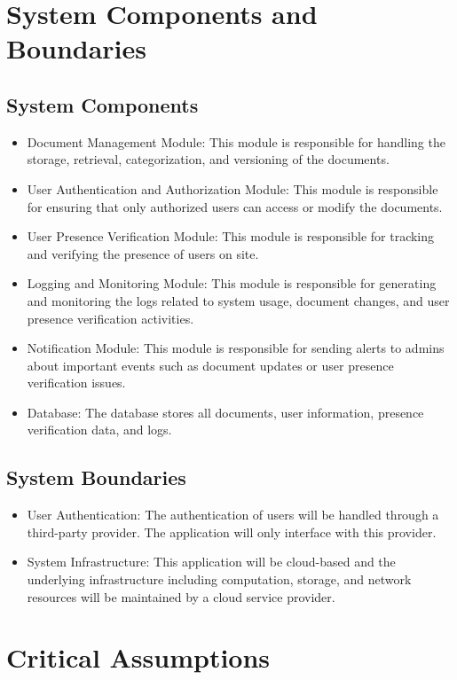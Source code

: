 \documentclass{article}
\begin{document}
\section{System Components and Boundaries}

\subsection{System Components}
\begin{itemize}
  \item Document Management Module: This module is responsible for handling the
    storage, retrieval, categorization, and versioning of the documents.
  \item User Authentication and Authorization Module: This module is responsible
    for ensuring that only authorized users can access or modify the
    documents.
  \item User Presence Verification Module: This module is responsible for
    tracking and verifying the presence of users on site.
  \item Logging and Monitoring Module: This module is responsible for generating
    and monitoring the logs related to system usage, document changes, and
    user presence verification activities.
  \item Notification Module: This module is responsible for sending alerts to
    admins about important events such as document updates or user presence
    verification issues.
  \item Database: The database stores all documents, user information, presence
    verification data, and logs.
\end{itemize}

\subsection{System Boundaries}
\begin{itemize}
  \item User Authentication: The authentication of users will be handled through
    a third-party provider. The application will only interface with this
    provider.
  \item System Infrastructure: This application will be cloud-based and the
    underlying infrastructure including computation, storage, and network
    resources will be maintained by a cloud service provider.

\end{itemize}
\section{Critical Assumptions}
\end{document}
